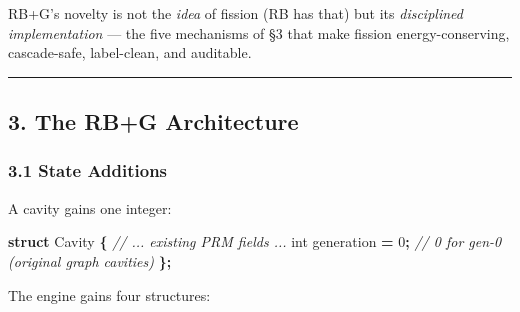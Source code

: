 \documentclass[
  11pt,
  a4paper,
]{article}
\newenvironment{Shaded}{\begin{snugshade}}{\end{snugshade}}
\newcommand{\CommentTok}[1]{\textcolor[rgb]{0.56,0.35,0.01}{\textit{#1}}}
\newcommand{\DataTypeTok}[1]{\textcolor[rgb]{0.13,0.29,0.53}{#1}}
\newcommand{\DecValTok}[1]{\textcolor[rgb]{0.00,0.00,0.81}{#1}}
\newcommand{\KeywordTok}[1]{\textcolor[rgb]{0.13,0.29,0.53}{\textbf{#1}}}
\newcommand{\NormalTok}[1]{#1}
\newcommand{\OperatorTok}[1]{\textcolor[rgb]{0.81,0.36,0.00}{\textbf{#1}}}
\begin{document}
RB+G's novelty is not the \emph{idea} of fission (RB has that) but its
\emph{disciplined implementation} --- the five mechanisms of §3 that
make fission energy-conserving, cascade-safe, label-clean, and
auditable.

\begin{center}\rule{0.5\linewidth}{0.5pt}\end{center}

\subsection{3. The RB+G Architecture}\label{the-rbg-architecture}

\subsubsection{3.1 State Additions}\label{state-additions}

A cavity gains one integer:

\begin{Shaded}
\begin{Highlighting}[]
\KeywordTok{struct}\NormalTok{ Cavity }\OperatorTok{\{}
    \CommentTok{// ... existing PRM fields ...}
    \DataTypeTok{int}\NormalTok{   generation    }\OperatorTok{=} \DecValTok{0}\OperatorTok{;}   \CommentTok{// 0 for gen{-}0 (original graph cavities)}
\OperatorTok{\};}
\end{Highlighting}
\end{Shaded}

The engine gains four structures:
\end{document}
